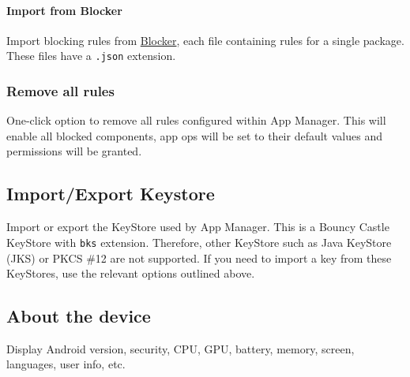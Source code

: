 \paragraph{Import from Blocker} Import blocking rules from \href{https://github.com/lihenggui/blocker}{Blocker}, each
file containing rules for a single package.
These files have a \texttt{.json} extension.

\subsubsection{Remove all rules} %
One-click option to remove all rules configured within App Manager.
This will enable all blocked components, app ops will be set to their default values and permissions will be granted.

\subsection{Import/Export Keystore}\label{subsec:import/export-keystore} %
Import or export the KeyStore used by App Manager.
This is a Bouncy Castle KeyStore with \texttt{bks} extension.
Therefore, other KeyStore such as Java KeyStore (JKS) or PKCS \#12 are not supported.
If you need to import a key from these KeyStores, use the relevant options outlined above.

\subsection{About the device}\label{subsec:device-info} %
Display Android version, security, CPU, GPU, battery, memory, screen, languages, user info, etc.
